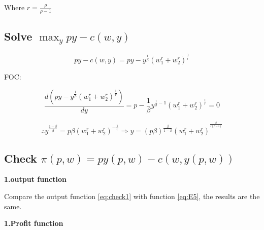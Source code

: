 \documentclass{article}
\begin{document}
Where $r = \frac{\rho}{\rho -1}$

\subsection{Solve $\max_y py - c(w, y)$ }

$$py - c(w, y) = py - y^{\frac{1}{\beta}}{(w_1^r + w_2^r)^{\frac{1}{r}}} $$

FOC:

$$\frac{d(py - y^{\frac{1}{\beta}}{(w_1^r + w_2^r)^{\frac{1}{r}}})}{dy}= p - \frac{1}{\beta}y^{\frac{1}{\beta} - 1} (w_1^r + w_2^r)^{\frac{1}{r}} = 0$$

\begin{equation}
\therefore y^{\frac{1- \beta}{\beta}} = p \beta (w_1^r + w_2^r)^{-\frac{1}{r}}  \Rightarrow y =  (p \beta)^{\frac{\beta}{1- \beta}} (w_1^r + w_2^r)^{^{\frac{\beta}{r(\beta - 1)}}}
    \label{eq:check1}   
\end{equation}

\subsection{Check $\pi (p,w) = py(p,w) - c(w, y(p,w))$}

\textbf{1.output function}

Compare the output function \ref{eq:check1} with function \ref{eq:E5}, the results are the same.

\textbf{1.Profit function}
\end{document}
